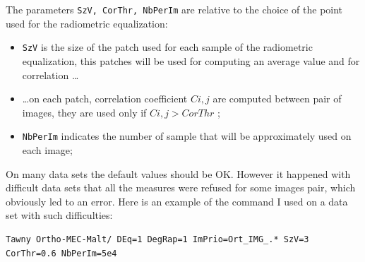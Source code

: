 The parameters {\tt SzV, CorThr, NbPerIm} are relative to the choice of the point
used for the radiometric equalization:


\begin{itemize}
   \item {\tt SzV} is the size of the patch used for each sample of the radiometric equalization,
         this patches will be used for computing an average value and for correlation  \dots

   \item  \dots on each patch, correlation coefficient  $C{i,j}$ are computed between pair 
          of images, they are used only if  $C{i,j} > CorThr$ ;
 
   \item {\tt NbPerIm} indicates the number of sample that will be approximately used on each image;

\end{itemize}


On many data sets the default values should be OK. However it happened with difficult data
sets that all the measures were refused for some images pair, which obviously led to an error.
Here is an example of the command I used on a data set with such difficulties:


\begin{verbatim}
Tawny Ortho-MEC-Malt/ DEq=1 DegRap=1 ImPrio=Ort_IMG_.* SzV=3 CorThr=0.6 NbPerIm=5e4
\end{verbatim}

